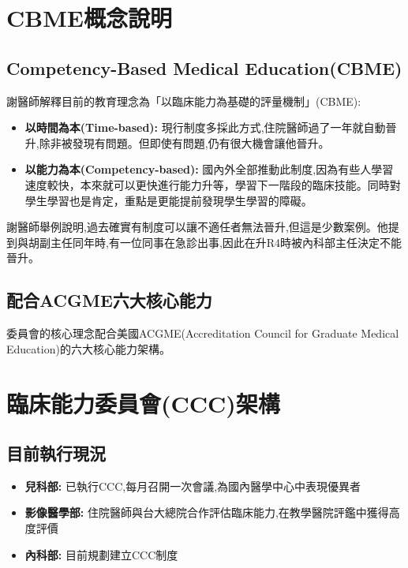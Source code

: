 \documentclass[12pt,a4paper]{article}
\begin{document}
\section{CBME概念說明}

\subsection{Competency-Based Medical Education(CBME)}

謝醫師解釋目前的教育理念為「以臨床能力為基礎的評量機制」(CBME):

\begin{itemize}[leftmargin=*]
    \item \textbf{以時間為本(Time-based):} 現行制度多採此方式,住院醫師過了一年就自動晉升,除非被發現有問題。但即使有問題,仍有很大機會讓他晉升。
    \item \textbf{以能力為本(Competency-based):} 國內外全部推動此制度,因為有些人學習速度較快，本來就可以更快進行能力升等，學習下一階段的臨床技能。同時對學生學習也是肯定，重點是更能提前發現學生學習的障礙。
\end{itemize}

謝醫師舉例說明,過去確實有制度可以讓不適任者無法晉升,但這是少數案例。他提到與胡副主任同年時,有一位同事在急診出事,因此在升R4時被內科部主任決定不能晉升。

\subsection{配合ACGME六大核心能力}

委員會的核心理念配合美國ACGME(Accreditation Council for Graduate Medical Education)的六大核心能力架構。

\section{臨床能力委員會(CCC)架構}

\subsection{目前執行現況}

\begin{itemize}[leftmargin=*]
    \item \textbf{兒科部:} 已執行CCC,每月召開一次會議,為國內醫學中心中表現優異者
    \item \textbf{影像醫學部:} 住院醫師與台大總院合作評估臨床能力,在教學醫院評鑑中獲得高度評價
    \item \textbf{內科部:} 目前規劃建立CCC制度
\end{itemize}
\end{document}
